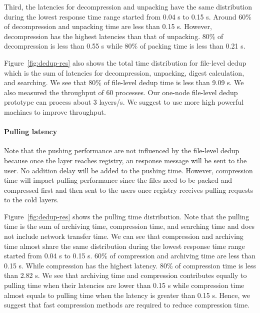 Third, the latencies for decompression and unpacking have the same distribution during the lowest response time range started
from 0.04 s to 0.15 s. Around 60\% of decompression and unpacking time are less than 0.15 s. However, decompression has the highest
latencies than that of unpacking. 80\% of decompression is less than 0.55 s while 80\% of packing time is less than 0.21 s. 

Figure~\ref{fig:dedup-res} also shows the total time distribution for file-level dedup which is the sum of latencies for decompression,
unpacking, digest calculation, and searching. We see that 80\% of file-level dedup time is less than 9.09 s.
%
%
We also measured the 
throughput of 60 processes. Our one-node file-level dedup prototype can process about 3 layers/s. We suggest to use more high 
powerful machines to improve throughput.

\paragraph{Pulling latency}
Note that the pushing performance are not influenced by the file-level dedup because once the layer reaches registry,
an response message will be sent to the user.
%
%
No addition delay will be added to the pushing time. However, compression time will impact pulling performance since the files need to be packed and compressed first and then sent to the users once registry receives pulling requests to the cold layers. 

Figure~\ref{fig:dedup-res} shows the pulling time distribution. Note that the pulling time is the sum of archiving time, compression time, and searching time and does not include network transfer time. We can see that 
compression and archiving time almost share the same distribution during the lowest response time range started from 0.04 s to 0.15 s. 60\% of compression and archiving time are less than 0.15 s. While compression has the highest latency. 80\% of compression time is less than 2.82 s. We see that archiving time and compression contributes equally to pulling time when their latencies are lower than 0.15 s while compression time almost equals to pulling time when the latency is greater than 0.15 s. Hence, we suggest that fast compression methods are required to reduce compression time.  
%
 
